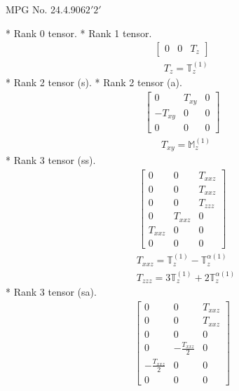 \documentclass[fleqn,8pt,landscape]{jsarticle}
\begin{document}
\setcounter{MaxMatrixCols}{32}

\renewcommand{\tablename}{Table~}
\renewcommand{\figurename}{Figure~}
\begin{center}
\LARGE
MPG No. 24.4.90\quad$62'2'$
\end{center}
* Rank 0 tensor.
* Rank 1 tensor.
\begin{align*}
\begin{bmatrix} 0 & 0 & T_{z} \end{bmatrix}
\end{align*}
\begin{align*}
& T_{z} = \mathbb{T}_{z}^{(1)}
\end{align*}
* Rank 2 tensor (s).
* Rank 2 tensor (a).
\begin{align*}
\begin{bmatrix} 0 & T_{xy} & 0 \\ - T_{xy} & 0 & 0 \\ 0 & 0 & 0 \end{bmatrix}
\end{align*}
\begin{align*}
& T_{xy} = \mathbb{M}_{z}^{(1)}
\end{align*}
* Rank 3 tensor (ss).
\begin{align*}
\begin{bmatrix} 0 & 0 & T_{xxz} \\ 0 & 0 & T_{xxz} \\ 0 & 0 & T_{zzz} \\ 0 & T_{xxz} & 0 \\ T_{xxz} & 0 & 0 \\ 0 & 0 & 0 \end{bmatrix}
\end{align*}
\begin{align*}
& T_{xxz} = \mathbb{T}_{z}^{(1)} - \mathbb{T}_{z}^{\alpha(1)} \\
& T_{zzz} = 3 \mathbb{T}_{z}^{(1)} + 2 \mathbb{T}_{z}^{\alpha(1)}
\end{align*}
* Rank 3 tensor (sa).
\begin{align*}
\begin{bmatrix} 0 & 0 & T_{xxz} \\ 0 & 0 & T_{xxz} \\ 0 & 0 & 0 \\ 0 & - \frac{T_{xxz}}{2} & 0 \\ - \frac{T_{xxz}}{2} & 0 & 0 \\ 0 & 0 & 0 \end{bmatrix}
\end{align*}
\end{document}

